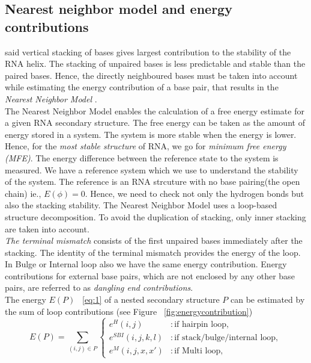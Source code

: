 \documentclass[twoside,a4paper]{report}
\numberwithin{equation}{section}
\begin{document}
 	 
 	 \subsection{Nearest neighbor model and energy contributions }
 	 
 	 \citet{DeVoe1962TheSO} said vertical stacking of bases gives largest contribution to the stability of the RNA helix. The stacking of unpaired bases is less predictable and stable than the paired bases. Hence, the directly neighboured bases must be taken into account while estimating the energy contribution of a  base pair, that results in the \textit{Nearest Neighbor Model} \citep{borer1974stability}.\\
 	 
 	 The Nearest Neighbor Model enables the calculation of a free energy estimate for a given RNA secondary structure. The free energy can be taken as the amount of energy stored in a system. The system is more stable when the energy is lower. Hence, for the \textit{most stable structure} of RNA, we go for \textit{minimum free energy (MFE)}. The energy difference between the reference state to the system is measured. We have a reference system which we use to understand the stability of the system. The reference is an RNA strcuture with no base pairing(the open chain) ie., $ E(\phi) =0 $. Hence, we need to check not only the hydrogen bonds but also the stacking stability. The Nearest Neighbor Model uses a loop-based structure decomposition. To avoid the duplication of stacking, only inner stacking are taken into account. \\
 	 
 	 \textit{The terminal mismatch} consists of the first unpaired bases immediately after the stacking. The identity of the terminal mismatch provides the energy of the loop. In Bulge or Internal loop also we have the same energy contribution. Energy contributions for external base pairs, which are not enclosed by any other base pairs, are referred to as \textit{dangling end contributions}.\\ 
 	 The energy $E(P)$ ~\ref{eq:1} of a nested secondary structure $P$ can be estimated by the sum of loop contributions (see Figure ~\ref{fig:energycontribution})\\
 	 
 	 \begin{equation}
 	 \label{eq:1}
 	 E(P) = \sum_{(i,j) \in P} \begin{cases}
 	 e^H(i,j) & : \text{if hairpin loop}, \\
 	 e^{SBI}(i,j,k,l) & : \text{if stack/bulge/internal loop} ,\\
 	 e^M(i,j,x,x') & : \text{if Multi loop},
 	 \end{cases}
 	 \end{equation}
 	 
\end{document}
